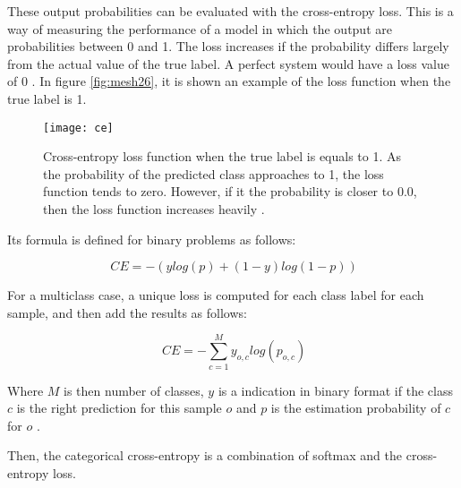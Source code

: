	These output probabilities can be evaluated with the cross-entropy loss. This is a way of measuring the performance of a model in which the output are probabilities between 0 and 1. The loss increases if the probability differs largely from the actual value of the true label. A perfect system would have a loss value of 0 \cite{MLGlossary2017}. In figure \ref{fig:mesh26}, it is shown an example of the loss function when the true label is 1.
	
	\begin{figure}
		\centering
		\captionsetup{justification=centering}
		\texttt{[image: ce]}
		\caption{Cross-entropy loss function when the true label is equals to 1. As the probability of the predicted class approaches to 1, the loss function tends to zero. However, if it the probability is closer to 0.0, then the loss function increases heavily \cite{MLGlossary2017}.}
	\end{figure}

	Its formula is defined for binary problems as follows:
	
	\[
	\ CE = -(ylog(p) + (1 - y)log(1 - p))
	\]

	For a multiclass case, a unique loss is computed for each class label for each sample, and then add the results as follows:
	
	\[
	\ CE = - \sum_{c=1}^{M} y_{o,c}log(p_{o,c})
	\]
	
	Where $M$ is then number of classes, $y$ is a indication in binary format if the class $c$ is the right prediction for this sample $o$ and $p$ is the estimation probability of $c$ for $o$ \cite{MLGlossary2017}. 
	
	Then, the categorical cross-entropy is a combination of softmax and the cross-entropy loss.
	
	
	